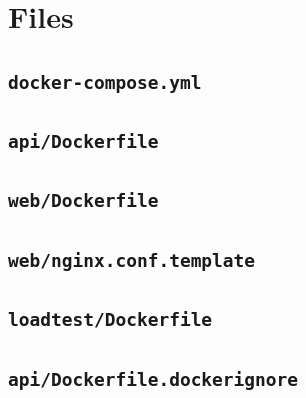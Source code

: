 \documentclass[11pt,a4paper]{article}
\begin{document}
\section{Files}\label{app:files}
\subsection*{\texttt{docker-compose.yml}}

\subsection*{\texttt{api/Dockerfile}}

\subsection*{\texttt{web/Dockerfile}}

\subsection*{\texttt{web/nginx.conf.template}}

\subsection*{\texttt{loadtest/Dockerfile}}

\subsection*{\texttt{api/Dockerfile.dockerignore}}

\end{document}
